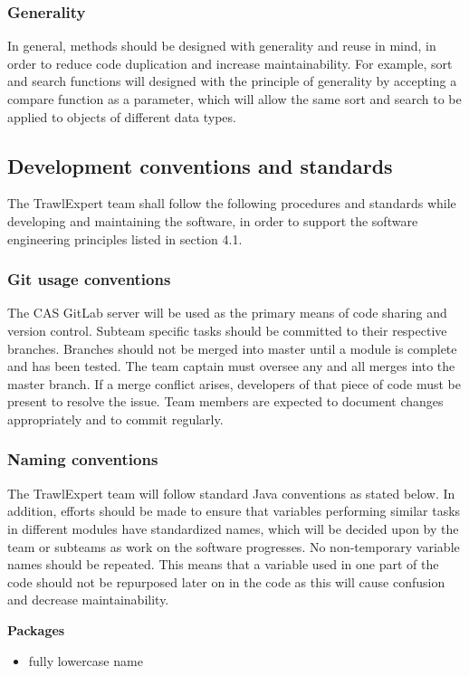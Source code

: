\documentclass{article}
\begin{document}
\subsubsection{Generality}
In general, methods should be designed with generality and reuse in mind, in order to reduce code duplication and increase maintainability. For example, sort and search functions will designed with the principle of generality by accepting a compare function as a parameter, which will allow the same sort and search to be applied to objects of different data types.  

\subsection{Development conventions and standards}
The TrawlExpert team shall follow the following procedures and standards while developing and maintaining the software, in order to support the software engineering principles listed in section 4.1.

\subsubsection{Git usage conventions}
The CAS GitLab server will be used as the primary means of code sharing and version control. Subteam specific tasks should be committed to their respective branches. Branches should not be merged into master until a module is complete and has been tested. The team captain must oversee any and all merges into the master branch. If a merge conflict arises, developers of that piece of code must be present to resolve the issue. Team members are expected to document changes appropriately and to commit regularly.

\subsubsection{Naming conventions}
The TrawlExpert team will follow standard Java conventions as stated below.
In addition, efforts should be made to ensure that variables performing similar tasks in different modules have standardized names, which will be decided upon by the team or subteams as work on the software progresses. No non-temporary variable names should be repeated. This means that a variable used in one part of the code should not be repurposed later on in the code as this will cause confusion and decrease maintainability.
 
\noindent\textbf{Packages}
\begin{itemize}
\item fully lowercase name
\end{itemize}
 
\end{document}
